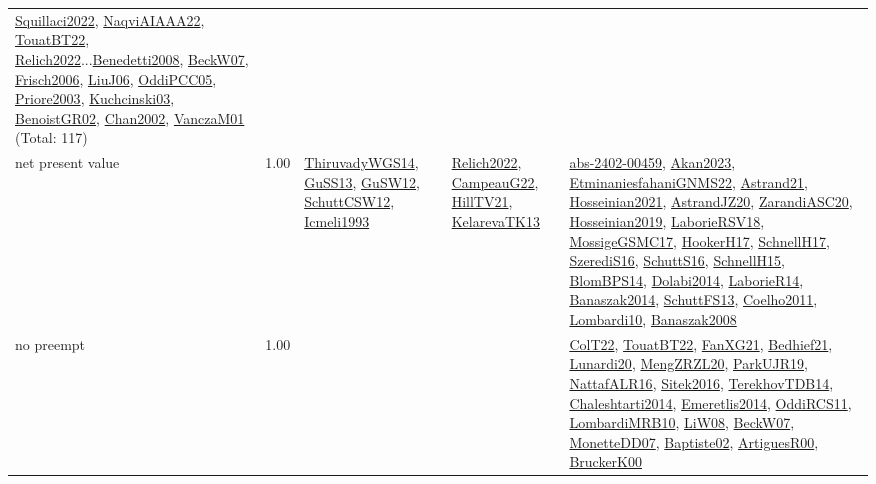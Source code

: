 {\begin{longtable}{p{3cm}r>{\raggedright\arraybackslash}p{6cm}>{\raggedright\arraybackslash}p{6cm}>{\raggedright\arraybackslash}p{8cm}}
\hyperref[detail:Squillaci2022]{Squillaci2022}, \hyperref[detail:NaqviAIAAA22]{NaqviAIAAA22}, \hyperref[detail:TouatBT22]{TouatBT22}, \hyperref[detail:Relich2022]{Relich2022}...\hyperref[detail:Benedetti2008]{Benedetti2008}, \hyperref[detail:BeckW07]{BeckW07}, \hyperref[detail:Frisch2006]{Frisch2006}, \hyperref[detail:LiuJ06]{LiuJ06}, \hyperref[detail:OddiPCC05]{OddiPCC05}, \hyperref[detail:Priore2003]{Priore2003}, \hyperref[detail:Kuchcinski03]{Kuchcinski03}, \hyperref[detail:BenoistGR02]{BenoistGR02}, \hyperref[detail:Chan2002]{Chan2002}, \hyperref[detail:VanczaM01]{VanczaM01} (Total: 117)\\
\index{net present value}\index{Concepts!net present value}net present value &  1.00 & \hyperref[detail:ThiruvadyWGS14]{ThiruvadyWGS14}, \hyperref[detail:GuSS13]{GuSS13}, \hyperref[detail:GuSW12]{GuSW12}, \hyperref[detail:SchuttCSW12]{SchuttCSW12}, \hyperref[detail:Icmeli1993]{Icmeli1993} & \hyperref[detail:Relich2022]{Relich2022}, \hyperref[detail:CampeauG22]{CampeauG22}, \hyperref[detail:HillTV21]{HillTV21}, \hyperref[detail:KelarevaTK13]{KelarevaTK13} & \hyperref[detail:abs-2402-00459]{abs-2402-00459}, \hyperref[detail:Akan2023]{Akan2023}, \hyperref[detail:EtminaniesfahaniGNMS22]{EtminaniesfahaniGNMS22}, \hyperref[detail:Astrand21]{Astrand21}, \hyperref[detail:Hosseinian2021]{Hosseinian2021}, \hyperref[detail:AstrandJZ20]{AstrandJZ20}, \hyperref[detail:ZarandiASC20]{ZarandiASC20}, \hyperref[detail:Hosseinian2019]{Hosseinian2019}, \hyperref[detail:LaborieRSV18]{LaborieRSV18}, \hyperref[detail:MossigeGSMC17]{MossigeGSMC17}, \hyperref[detail:HookerH17]{HookerH17}, \hyperref[detail:SchnellH17]{SchnellH17}, \hyperref[detail:SzerediS16]{SzerediS16}, \hyperref[detail:SchuttS16]{SchuttS16}, \hyperref[detail:SchnellH15]{SchnellH15}, \hyperref[detail:BlomBPS14]{BlomBPS14}, \hyperref[detail:Dolabi2014]{Dolabi2014}, \hyperref[detail:LaborieR14]{LaborieR14}, \hyperref[detail:Banaszak2014]{Banaszak2014}, \hyperref[detail:SchuttFS13]{SchuttFS13}, \hyperref[detail:Coelho2011]{Coelho2011}, \hyperref[detail:Lombardi10]{Lombardi10}, \hyperref[detail:Banaszak2008]{Banaszak2008}\\
\index{no preempt}\index{Concepts!no preempt}no preempt &  1.00 &  &  & \hyperref[detail:ColT22]{ColT22}, \hyperref[detail:TouatBT22]{TouatBT22}, \hyperref[detail:FanXG21]{FanXG21}, \hyperref[detail:Bedhief21]{Bedhief21}, \hyperref[detail:Lunardi20]{Lunardi20}, \hyperref[detail:MengZRZL20]{MengZRZL20}, \hyperref[detail:ParkUJR19]{ParkUJR19}, \hyperref[detail:NattafALR16]{NattafALR16}, \hyperref[detail:Sitek2016]{Sitek2016}, \hyperref[detail:TerekhovTDB14]{TerekhovTDB14}, \hyperref[detail:Chaleshtarti2014]{Chaleshtarti2014}, \hyperref[detail:Emeretlis2014]{Emeretlis2014}, \hyperref[detail:OddiRCS11]{OddiRCS11}, \hyperref[detail:LombardiMRB10]{LombardiMRB10}, \hyperref[detail:LiW08]{LiW08}, \hyperref[detail:BeckW07]{BeckW07}, \hyperref[detail:MonetteDD07]{MonetteDD07}, \hyperref[detail:Baptiste02]{Baptiste02}, \hyperref[detail:ArtiguesR00]{ArtiguesR00}, \hyperref[detail:BruckerK00]{BruckerK00}\\

\end{longtable}}
